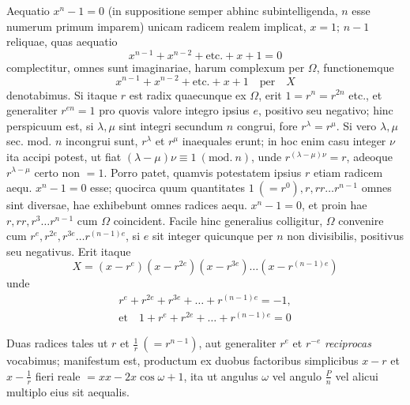 Aequatio \(x^n-1=0\) (in suppositione semper abhinc subintelligenda, \(n\) esse numerum primum imparem) unicam radicem realem implicat, \(x=1\); \(n-1\) reliquae, quas aequatio \[x^{n-1}+x^{n-2}+\mathrm{etc.}+x+1=0\] complectitur, omnes sunt imaginariae, harum complexum per \(\Omega\), functionemque \[x^{n-1}+x^{n-2}+\mathrm{etc.}+x+1\quad\text{per}\quad X\]
denotabimus. Si itaque \(r\) est radix quaecunque ex \(\Omega\), erit \(1=r^n=r^{2n}\) etc., et generaliter \(r^{en}=1\) pro quovis valore integro ipsius \(e\), positivo seu negativo; hinc perspicuum est, si \(\lambda,\allowbreak \mu\) sint integri secundum \(n\) congrui, fore \(r^\lambda=r^\mu\). Si vero \(\lambda,\allowbreak \mu\) sec. mod. \(n\) incongrui sunt, \(r^\lambda\) et \(r^\mu\) inaequales erunt; in hoc enim casu integer \(\nu\) ita accipi potest, ut fiat \((\lambda-\mu)\nu\equiv1\ (\mathrm{mod.}\ n)\), unde \(r^{(\lambda-\mu)\nu}=r\), adeoque \(r^{\lambda-\mu}\) certo non \(=1\). Porro patet, quamvis potestatem ipsius \(r\) etiam radicem aequ. \(x^n-1=0\) esse; quocirca quum quantitates \(1\ (=r^0),\allowbreak r,\allowbreak rr\ldots r^{n-1}\) omnes sint diversae, hae exhibebunt omnes radices aequ. \(x^n-1=0\), et proin hae \(r,\allowbreak rr,\allowbreak r^3\ldots r^{n-1}\) cum \(\Omega\) coincident. Facile hinc generalius colligitur, \(\Omega\) convenire cum \(r^e,\allowbreak r^{2e},\allowbreak r^{3e}\ldots r^{(n-1)e}\), si \(e\) sit integer quicunque per \(n\) non divisibilis, positivus seu negativus. Erit itaque \[X=(x-r^e)(x-r^{2e})(x-r^{3e})\ldots(x-r^{(n-1)e})\] unde \[\begin{gathered}
r^e+r^{2e}+r^{3e}+\ldots+r^{(n-1)e}=-1,\\
\text{et}\quad1+r^e+r^{2e}+\ldots+r^{(n-1)e}=0
\end{gathered}\]

Duas radices tales ut \(r\) et \(\frac1r\ (=r^{n-1})\), aut generaliter \(r^e\) et \(r^{-e}\) \textit{reciprocas} vocabimus; manifestum est, productum ex duobus factoribus simplicibus \(x-r\) et \(x-\frac1r\) fieri reale \(=xx-2x\cos\omega+1\), ita ut angulus \(\omega\) vel angulo \(\frac Pn\) vel alicui multiplo eius sit aequalis.

